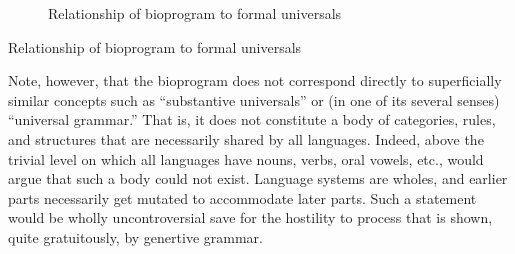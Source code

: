   


 

\begin{figure}
	\begin{center}
	\end{center}
	\caption{Relationship of bioprogram to formal universals}\label{fig:5.1}
\end{figure}

Relationship of bioprogram to formal universals

Note, however, that the bioprogram does not correspond directly to superficially similar concepts such as ``substantive universals'' or (in one of its several senses) ``universal grammar.'' That is, it does not constitute a body of categories, rules, and structures that are necessarily shared by all languages. Indeed, above the trivial level on which all languages have nouns, verbs, oral vowels, etc., would argue that such a body could not exist. Language systems are wholes, and earlier parts necessarily get mutated to accommodate later parts. Such a statement would be wholly uncontroversial save for the hostility to process that is shown, quite gratuitously, by genertive grammar.


